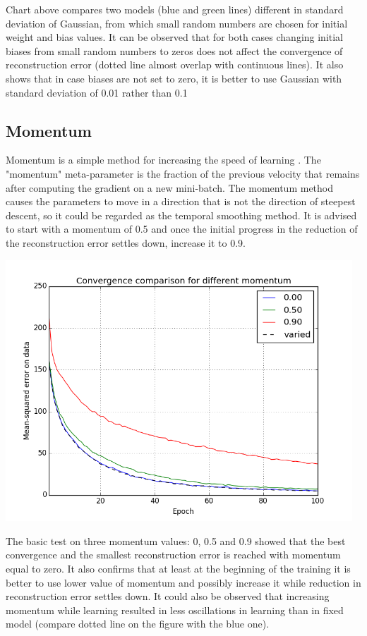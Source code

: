 \documentclass[a4paper]{scrartcl}
\begin{document}
Chart above compares two models (blue and green lines) different in standard deviation of Gaussian, from which small random numbers are chosen for initial weight and bias values. It can be observed that for both cases changing initial biases from small random numbers to zeros does not affect the convergence of reconstruction error (dotted line almost overlap with continuous lines). It also shows that in case biases are not set to zero, it is better to use Gaussian with standard deviation of 0.01 rather than 0.1
\subsection{Momentum}
Momentum is a simple method for increasing the speed of learning \cite{Hinton}. The "momentum" meta-parameter is the fraction of the previous velocity that remains after computing the gradient on a new mini-batch. The momentum method causes the parameters to move in a direction that is not the direction of steepest descent, so it could be regarded as the temporal smoothing method. It is advised \cite{Hinton} to start with a momentum of 0.5 and once the initial progress in the reduction of the reconstruction error settles down, increase it to 0.9. 
\begin{center}
\includegraphics[width=13cm]{images/momentum_var.png}
\vspace{-2em}
\end{center}
The basic test on three momentum values: 0, 0.5 and 0.9 showed that the best convergence and the smallest reconstruction error is reached with momentum equal to zero. It also confirms that at least at the beginning of the training it is better to use lower value of momentum and possibly increase it while reduction in reconstruction error settles down. It could also be observed that increasing momentum while learning resulted in less oscillations in learning than in fixed model (compare dotted line on the figure with the blue one).
\end{document}
